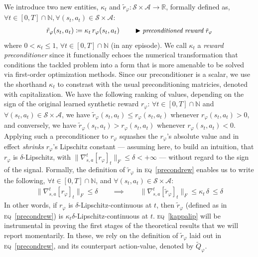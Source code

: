 We introduce two new entities, $\kappa_t$
and $\tilde{r}_\varphi : \mathcal{S} \times \mathcal{A} \to \mathbb{R}$, formally defined as,
$\forall t \in [0, T] \cap \mathbb{N},
\forall (s_t, a_t) \in \mathcal{S} \times \mathcal{A}$:
\begin{align}
\tilde{r}_\varphi (s_t,a_t)
\coloneqq \kappa_t \, r_\varphi (s_t,a_t)
\qquad
\blacktriangleright\text{\small{\textit{preconditioned reward $\tilde{r}_\varphi$}}}
\label{precondrew}
\end{align}
where $0 < \kappa_t \leq 1$, $\forall t \in [0, T] \cap \mathbb{N}$ (in any episode).
We call $\kappa_t$ a \emph{reward preconditioner} since it functionally echoes the numerical transformation
that conditions the tackled problem into a form that is more amenable to be solved via first-order optimization methods.
Since our preconditioner is a scalar,
we use the shorthand $\kappa_t$ to constrast with the usual preconditioning matricies,
denoted with capitalization.
We have the following ranking of values,
depending on the sign of the original learned synthetic reward $r_\varphi$:
$\forall t \in [0, T] \cap \mathbb{N}$ and
$\forall (s_t, a_t) \in \mathcal{S} \times \mathcal{A}$,
we have $\tilde{r}_\varphi (s_t,a_t) \leq r_\varphi (s_t,a_t)$ whenever $r_\varphi (s_t,a_t) > 0$,
and conversely,
we have $\tilde{r}_\varphi (s_t,a_t) > r_\varphi (s_t,a_t)$ whenever $r_\varphi (s_t,a_t) < 0$.
Applying such a preconditioner to $r_\varphi$ squashes the $r_\varphi$'s absolute value
and in effect \emph{shrinks} $r_\varphi$'s Lipschitz constant
--- assuming here, to build an intuition, that $r_\varphi$ is $\delta$-Lipschitz, with
$\lVert \nabla_{s,a}^t[r_\varphi]_t \rVert _F \leq \delta < +\infty$ ---
without regard to the sign of the signal.
Formally, the definition of $\tilde{r}_\varphi$ in \textsc{eq}~\ref{precondrew} enables us to write the following,
$\forall t \in [0, T] \cap \mathbb{N}$,
and $\forall (s_t, a_t) \in \mathcal{S} \times \mathcal{A}$:
\begin{align}
\lVert \nabla_{s,a}^t[r_\varphi]_t \rVert _F \leq \delta
\qquad \implies \qquad
\lVert \nabla_{s,a}^t[\tilde{r}_\varphi]_t \rVert _F \leq \kappa_t \, \delta
\: \leq \delta
\label{kappalip}
\end{align}
In other words, if $r_\varphi$ is $\delta$-Lipschitz-continuous at $t$, then $\tilde{r}_\varphi$
(defined as in \textsc{eq}~\ref{precondrew})
is $\kappa_t \delta$-Lipschitz-continuous at $t$.
\textsc{eq}~\ref{kappalip} will be instrumental in proving the first stages of
the theoretical results that we will report momentarily.
In these, we rely on the definition of $\tilde{r}_\varphi$ laid out in \textsc{eq}~\ref{precondrew},
and its counterpart action-value, denoted by $\widetilde{Q}_\varphi$.

